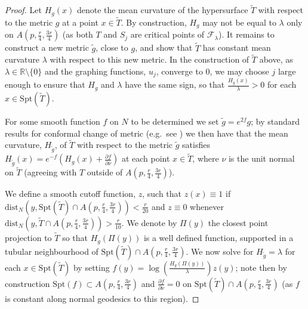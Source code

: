 \documentclass[11pt]{article}
\begin{document}
\begin{proof}
\bigskip
Let $H_g(x)$ denote the mean curvature of the hypersurface $\widetilde{T}$ with respect to the metric $g$ at a point $x \in \widetilde{T}$. By construction, $H_g$ may not be equal to $\lambda$ only on $A(p, \frac{r}{4}, \frac{3r}{4})$ (as both $T$ and $S_j$ are critical points of $\mathcal{F}_\lambda$). It remains to construct a new metric $\tilde{g}$, close to $g$, and show that $\widetilde{T}$ has constant mean curvature $\lambda$ with respect to this new metric. In the construction of $\widetilde{T}$ above, as $\lambda \in \mathbb{R} \setminus \{0\}$ and the graphing functions, $u_j$, converge to $0$, we may choose $j$ large enough to ensure that $H_g$ and $\lambda$ have the same sign, so that $\frac{H_g(x)}{\lambda} > 0$ for each $x \in \mathrm{Spt}(\widetilde{T})$.

\bigskip

For some smooth function $f$ on $N$ to be determined we set $\tilde{g} = e^{2f}g$; by standard results for conformal change of metric (e.g.~see \cite[Chapter II, Proposition 3.9]{sakai}) we then have that the mean curvature, $H_{\tilde{g}}$, of $\widetilde{T}$ with respect to the metric $\tilde{g}$ satisfies $H_{\tilde{g}}(x) = e^{-f}(H_g(x) + \frac{\partial f}{\partial \nu})$ at each point $x \in \widetilde{T}$, where $\nu$ is the unit normal on $\widetilde{T}$ (agreeing with $T$ outside of $A(p,\frac{r}{4},\frac{3r}{4})$).

\bigskip

We define a smooth cutoff function, $z$, such that $z(x) \equiv 1$ if $\mathrm{dist}_N(y,\mathrm{Spt}(\widetilde{T}) \cap A(p,\frac{r}{4},\frac{3r}{4})) < \frac{r}{20}$ and $z \equiv 0$ whenever $\mathrm{dist}_N(y,\widetilde{T} \cap A(p,\frac{r}{4},\frac{3r}{4})) > \frac{r}{10}$. We denote  by $\Pi(y)$ the closest point projection to $\widetilde{T}$ so that $H_g(\Pi(y))$ is a well defined function, supported in a tubular neighbourhood of $\mathrm{Spt}(\widetilde{T}) \cap A(p,\frac{r}{4},\frac{3r}{4})$. We now solve for $H_{\tilde{g}} = \lambda$ for each $x \in \mathrm{Spt}(\tilde{T})$ by setting $f(y) = \log\left(\frac{H_g(\Pi(y))}{\lambda}\right)z(y)$; note then  by construction $\mathrm{Spt}(f) \subset A(p,\frac{r}{4},\frac{3r}{4})$ and $\frac{\partial f}{\partial \nu} = 0$ on $\mathrm{Spt}(\widetilde{T}) \cap A(p,\frac{r}{4},\frac{3r}{4})$ (as $f$ is constant along normal geodesics to this region).

\bigskip


\end{proof}
\end{document}
